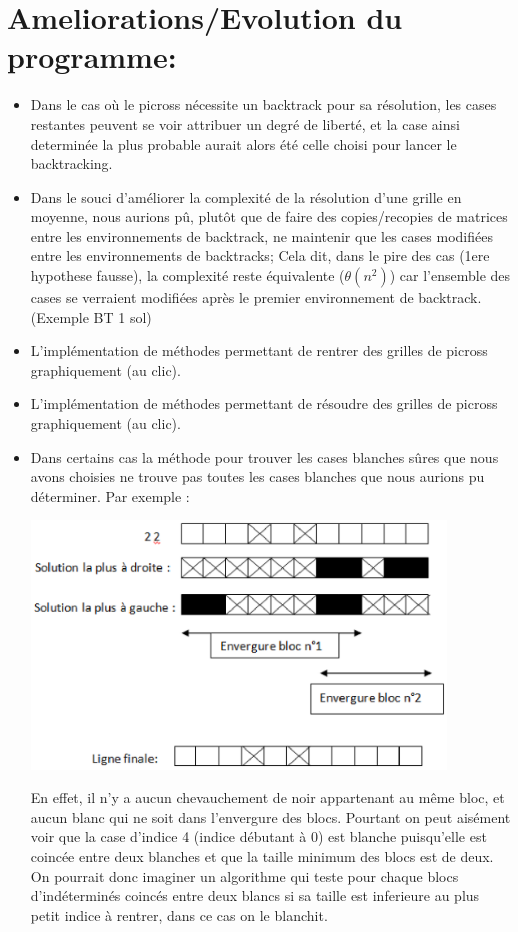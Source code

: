 \documentclass{article}
\begin{document}
\section{Ameliorations/Evolution du programme:}
\begin{itemize}
\item Dans le cas où le picross nécessite un backtrack pour sa résolution, les cases restantes peuvent se voir attribuer un degré de liberté, et la case ainsi determinée la plus probable aurait alors été celle choisi pour lancer le backtracking.
\item Dans le souci d'améliorer la complexité de la résolution d'une grille en moyenne, nous aurions pû, plutôt que de faire des copies/recopies de matrices entre les environnements de backtrack, ne maintenir que les cases modifiées entre les environnements de backtracks;
Cela dit, dans le pire des cas (1ere hypothese fausse), la complexité reste équivalente ($\theta(n^2)$) car l'ensemble des cases se verraient modifiées après le premier environnement de backtrack. (Exemple BT 1 sol)
\item L'implémentation de méthodes permettant de rentrer des grilles de picross graphiquement (au clic).
\item L'implémentation de méthodes permettant de résoudre des grilles de picross graphiquement (au clic).
\item Dans certains cas la méthode pour trouver les cases blanches sûres que nous avons choisies ne trouve pas toutes les cases blanches que nous aurions pu déterminer. Par exemple :
\begin{center}
\includegraphics[width=11cm]{image1}
\end{center}
En effet, il n’y a aucun chevauchement de noir appartenant au même bloc, et aucun blanc qui ne soit dans l’envergure des blocs. Pourtant on peut aisément voir que la case d’indice 4 (indice débutant à 0) est blanche puisqu’elle est coincée entre deux blanches et que la taille minimum des blocs est de deux. On pourrait donc imaginer un algorithme qui teste pour chaque blocs d’indéterminés coincés entre deux blancs si sa taille est inferieure au plus petit indice à rentrer,  dans ce cas on le blanchit.
\end{itemize}
\end{document}
